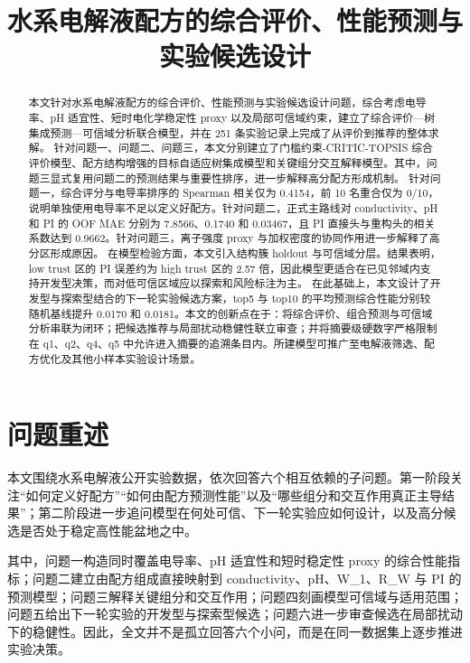 \documentclass[bwprint]{gmcmthesis}
\title{水系电解液配方的综合评价、性能预测与实验候选设计}
\numberwithin{figure}{section}
\begin{document}
\maketitle
\begin{abstract}
本文针对水系电解液配方的综合评价、性能预测与实验候选设计问题，综合考虑电导率、pH 适宜性、短时电化学稳定性 proxy 以及局部可信域约束，建立了综合评价—树集成预测—可信域分析联合模型，并在 251 条实验记录上完成了从评价到推荐的整体求解。
针对问题一、问题二、问题三，本文分别建立了门槛约束-CRITIC-TOPSIS 综合评价模型、配方结构增强的目标自适应树集成模型和关键组分交互解释模型。其中，问题三显式复用问题二的预测结果与重要性排序，进一步解释高分配方形成机制。
针对问题一，综合评分与电导率排序的 Spearman 相关仅为 0.4154，前 10 名重合仅为 0/10，说明单独使用电导率不足以定义好配方。针对问题二，正式主路线对 conductivity、pH 和 PI 的 OOF MAE 分别为 7.8566、0.1740 和 0.03467，且 PI 直接头与重构头的相关系数达到 0.9662。针对问题三，离子强度 proxy 与加权密度的协同作用进一步解释了高分区形成原因。
在模型检验方面，本文引入结构簇 holdout 与可信域分层。结果表明，low trust 区的 PI 误差约为 high trust 区的 2.57 倍，因此模型更适合在已见邻域内支持开发型决策，而对低可信区域应以探索和风险标注为主。
在此基础上，本文设计了开发型与探索型结合的下一轮实验候选方案，top5 与 top10 的平均预测综合性能分别较随机基线提升 0.0170 和 0.0181。本文的创新点在于：将综合评价、组合预测与可信域分析串联为闭环；把候选推荐与局部扰动稳健性联立审查；并将摘要级硬数字严格限制在 q1、q2、q4、q5 中允许进入摘要的追溯条目内。所建模型可推广至电解液筛选、配方优化及其他小样本实验设计场景。

\end{abstract}

\tableofcontents

\section{问题重述}

本文围绕水系电解液公开实验数据，依次回答六个相互依赖的子问题。第一阶段关注“如何定义好配方”“如何由配方预测性能”以及“哪些组分和交互作用真正主导结果”；第二阶段进一步追问模型在何处可信、下一轮实验应如何设计，以及高分候选是否处于稳定高性能盆地之中。\par

其中，问题一构造同时覆盖电导率、pH 适宜性和短时稳定性 proxy 的综合性能指标；问题二建立由配方组成直接映射到 conductivity、pH、W\_1、R\_W 与 PI 的预测模型；问题三解释关键组分和交互作用；问题四刻画模型可信域与适用范围；问题五给出下一轮实验的开发型与探索型候选；问题六进一步审查候选在局部扰动下的稳健性。因此，全文并不是孤立回答六个小问，而是在同一数据集上逐步推进实验决策。\par
\end{document}
